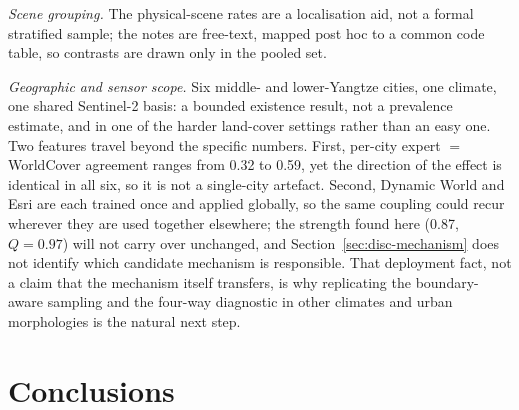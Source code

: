 \documentclass[remotesensing,article,submit,moreauthors]{Definitions/mdpi}
\begin{document}
\emph{Scene grouping.} The physical-scene rates are a localisation aid, not a
formal stratified sample; the notes are free-text, mapped post hoc to a common
code table, so contrasts are drawn only in the pooled set.

\emph{Geographic and sensor scope.} Six middle- and lower-Yangtze cities, one
climate, one shared Sentinel-2 basis: a bounded existence result, not a prevalence estimate, and in one of
the harder land-cover settings rather than an easy one. Two features travel
beyond the specific numbers. First, per-city expert $=$ WorldCover agreement
ranges from 0.32 to 0.59, yet the direction of the effect is identical in all
six, so it is not a single-city artefact. Second, Dynamic World and Esri are
each trained once and applied globally, so the same coupling could recur
wherever they are used together elsewhere; the strength found here (0.87, $Q
= 0.97$) will not carry over unchanged, and Section~\ref{sec:disc-mechanism}
does not identify which candidate mechanism is responsible. That deployment
fact, not a claim that the mechanism itself transfers, is why replicating the
boundary-aware sampling and the four-way diagnostic in
other climates and urban morphologies is the natural next step.


\section{Conclusions}\label{sec:conclusions}
\end{document}
